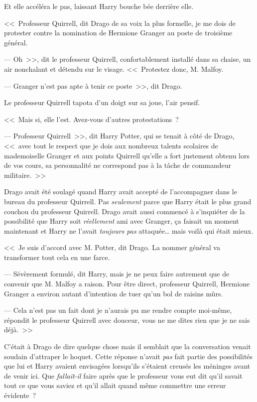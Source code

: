Et elle accéléra le pas, laissant Harry bouche bée derrière elle.

\later

<<~Professeur Quirrell, dit Drago de sa voix la plus formelle, je me dois de protester contre la nomination de Hermione Granger au poste de troisième général.

--- Oh~>>, dit le professeur Quirrell, confortablement installé dans sa chaise, un air nonchalant et détendu sur le visage. <<~Protestez donc, M. Malfoy.

--- Granger n'est pas apte à tenir ce poste~>>, dit Drago.

Le professeur Quirrell tapota d'un doigt sur sa joue, l'air pensif.

<<~Mais si, elle l'est. Avez-vous d'autres protestations~?

--- Professeur Quirrell~>>, dit Harry Potter, qui se tenait à côté de Drago, <<~avec tout le respect que je dois aux nombreux talents scolaires de mademoiselle Granger et aux points Quirrell qu'elle a fort justement obtenu lors de vos cours, sa personnalité ne correspond pas à la tâche de commandeur militaire.~>>

Drago avait été soulagé quand Harry avait accepté de l'accompagner dans le bureau du professeur Quirrell. Pas \emph{seulement} parce que Harry était le plus grand couchou du professeur Quirrell. Drago avait aussi commencé à s'inquiéter de la possibilité que Harry soit \emph{réellement} ami avec Granger, ça faisait un moment maintenant et Harry ne l'avait \emph{toujours pas} attaquée… mais voilà qui était mieux.

<<~Je suis d'accord avec M. Potter, dit Drago. La nommer général va transformer tout cela en une farce.

--- Sévèrement formulé, dit Harry, mais je ne peux faire autrement que de convenir que M. Malfoy a raison. Pour être direct, professeur Quirrell, Hermione Granger a environ autant d'intention de tuer qu'un bol de raisins mûrs.

--- Cela n'est pas un fait dont je n'aurais pu me rendre compte moi-même, répondit le professeur Quirrell avec douceur, vous ne me dites rien que je ne sais déjà.~>>

C'était à Drago de dire quelque chose mais il semblait que la conversation venait soudain d'attraper le hoquet. Cette réponse n'avait \emph{pas} fait partie des possibilités que lui et Harry avaient envisagées lorsqu'ils s'étaient creusés les méninges avant de venir ici. Que \emph{fallait-il} faire après que le professeur vous eut dit qu'il savait tout ce que vous saviez et qu'il allait quand même commettre une erreur évidente~?


